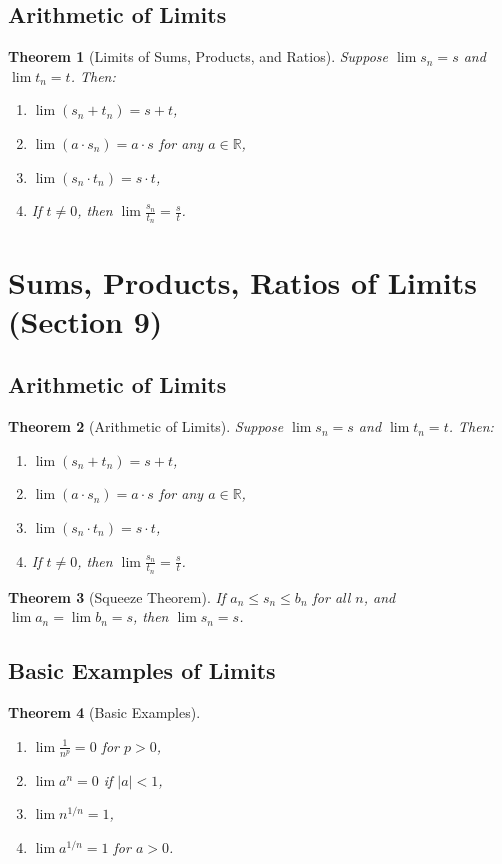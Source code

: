 \documentclass[9pt]{article}
\theoremstyle{definition}
\theoremstyle{plain}
\newtheorem{theorem}{Theorem}
\begin{document}
\subsection*{Arithmetic of Limits}
\begin{theorem}[Limits of Sums, Products, and Ratios]
Suppose \( \lim s_n = s \) and \( \lim t_n = t \). Then:
\begin{enumerate}
    \item \( \lim (s_n + t_n) = s + t \),
    \item \( \lim (a \cdot s_n) = a \cdot s \) for any \( a \in \mathbb{R} \),
    \item \( \lim (s_n \cdot t_n) = s \cdot t \),
    \item If \( t \neq 0 \), then \( \lim \frac{s_n}{t_n} = \frac{s}{t} \).
\end{enumerate}
\end{theorem}
\section*{Sums, Products, Ratios of Limits (Section 9)}

\subsection*{Arithmetic of Limits}
\begin{theorem}[Arithmetic of Limits]
Suppose \( \lim s_n = s \) and \( \lim t_n = t \). Then:
\begin{enumerate}
    \item \( \lim (s_n + t_n) = s + t \),
    \item \( \lim (a \cdot s_n) = a \cdot s \) for any \( a \in \mathbb{R} \),
    \item \( \lim (s_n \cdot t_n) = s \cdot t \),
    \item If \( t \neq 0 \), then \( \lim \frac{s_n}{t_n} = \frac{s}{t} \).
\end{enumerate}
\end{theorem}

\begin{theorem}[Squeeze Theorem]
If \( a_n \leq s_n \leq b_n \) for all \( n \), and \( \lim a_n = \lim b_n = s \), then \( \lim s_n = s \).
\end{theorem}

\subsection*{Basic Examples of Limits}
\begin{theorem}[Basic Examples]
\leavevmode
\begin{enumerate}
    \item \( \lim \frac{1}{n^p} = 0 \) for \( p > 0 \),
    \item \( \lim a^n = 0 \) if \( |a| < 1 \),
    \item \( \lim n^{1/n} = 1 \),
    \item \( \lim a^{1/n} = 1 \) for \( a > 0 \).
\end{enumerate}
\end{theorem}
\end{document}
